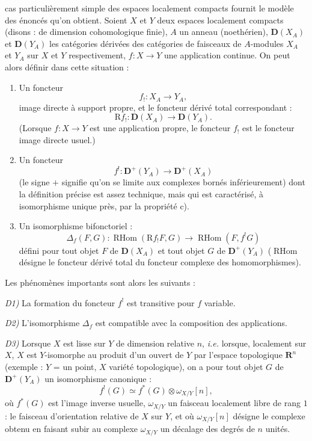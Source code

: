 %
cas particulièrement simple des espaces localement compacts fournit le
modèle des énoncés qu'on obtient. Soient $X$ et $Y$ deux espaces localement
compacts (disons : de dimension cohomologique finie), $A$ un anneau
(noethérien), $\mathbf D(X_A)$ et $\mathbf D(Y_A)$ les catégories dérivées
des catégories de faisceaux de $A$-modules $X_A$ et $Y_A$ sur $X$ et $Y$
respectivement, $f\colon X\longrightarrow Y$ une application continue. On
peut alors définir dans cette situation :

\begin{enumerate}
\renewcommand{\labelenumi}{\alph{enumi})}
\item Un foncteur
\[
f_!\colon X_A\longrightarrow Y_A,
\]
image directe à support propre, et le foncteur dérivé total correspondant :
\[
\mathrm Rf_!\colon \mathbf D(X_A)\longrightarrow \mathbf D(Y_A).
\]
(Lorsque $f\colon X\longrightarrow Y$ est une application propre, le
foncteur $f_!$ est le foncteur image directe usuel.)

\item Un foncteur
\[
f^!\colon \mathbf D^+(Y_A)\longrightarrow \mathbf D^+(X_A)
\]
(le signe $+$ signifie qu'on se limite aux complexes bornés inférieurement)
dont la définition précise est assez technique, mais qui est caractérisé, à
isomorphisme unique près, par la propriété c).

\item Un isomorphisme bifonctoriel :
\[
\Delta_f(F,G)\colon
\operatorname{RHom}(\mathrm Rf_!F,G)
\longrightarrow
\operatorname{RHom}(F,f^!G)
\]
défini pour tout objet $F$ de $\mathbf D(X_A)$ et tout objet $G$ de
$\mathbf D^+(Y_A)$ ($\operatorname{RHom}$ désigne le foncteur dérivé total
du foncteur \og complexe des homomorphismes\fg{}).
\end{enumerate}

Les phénomènes importants sont alors les suivants :

\noindent\textit{D1)} La formation du foncteur $f^!$ est transitive pour $f$
variable.

\noindent\textit{D2)} L'isomorphisme $\Delta_f$ est compatible avec la
composition des applications.

\noindent\textit{D3)} Lorsque $X$ est lisse sur $Y$ de dimension relative
$n$, \emph{i.e.} lorsque, localement sur $X$, $X$ est $Y$-isomorphe au
produit d'un ouvert de $Y$ par l'espace topologique $\mathbf R^n$ (exemple :
$Y$ = un point, $X$ variété topologique), on a pour tout objet $G$ de
$\mathbf D^+(Y_A)$ un isomorphisme canonique :
\[
f^!(G)\simeq f^*(G)\otimes\omega_{X/Y}[n],
\]
où $f^*(G)$ est l'image inverse usuelle, $\omega_{X/Y}$ un faisceau
localement libre de rang $1$ : le faisceau d'orientation relative de $X$ sur
$Y$, et où $\omega_{X/Y}[n]$ désigne le complexe obtenu en faisant subir au
complexe $\omega_{X/Y}$ un décalage des degrés de $n$ unités.
